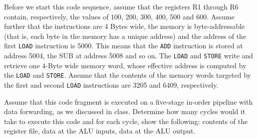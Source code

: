 \documentclass[12pt,letterpaper]{hmcpset}
\begin{document}
\problemlist{}

\begin{problem}[1]
Before we start this code sequence, assume that the registers R1 through R6 contain, respectively, the values of 100, 200, 300, 400, 500 and 600.  Assume further that the instructions are 4 Bytes wide, the memory is byte-addressable (that is, each byte in the memory has a unique address) and the address of the first \texttt{LOAD} instruction is 5000.  This means that the \texttt{ADD} instruction is stored at address 5004, the SUB at address 5008 and so on.  The \texttt{LOAD} and \texttt{STORE} write and retrieve one 4-Byte wide memory word, whose effective address is computed by the \texttt{LOAD} and \texttt{STORE}.  Assume that the contents of the memory words targeted by the first and second \texttt{LOAD} instructions are 3205 and 6409, respectively.

Assume that this code fragment is executed on a five-stage in-order pipeline with data forwarding, as we discussed in class. Determine how many cycles would it take to execute this code and for each cycle, show the following: contents of the register file, data at the ALU inputs, data at the ALU output.

\end{problem}
\end{document}
